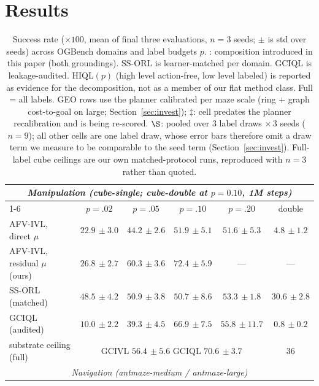 \documentclass{article}
\newcommand{\pmm}[2]{#1{\scriptstyle\,\pm #2}}
\theoremstyle{plain}
\theoremstyle{definition}
\newcommand{\best}[1]{\bm{#1}}
\begin{document}
\section{Results}
\label{sec:results}
\begin{table}[t]
\centering
\caption{Success rate ($\times 100$, mean of final three evaluations, $n{=}3$ seeds; $\pm$ is std over seeds) across OGBench domains and label budgets $p$. \dag: composition introduced in this paper (both groundings). SS-ORL is learner-matched per domain. GCIQL is leakage-audited. HIQL$(p)$ (high level action-free, low level labeled) is reported as evidence for the decomposition, not as a member of our flat method class. Full = all labels. GEO rows use the planner calibrated per maze scale (ring + graph cost-to-goal on large; Section~\ref{sec:invest}); $\ddagger$: cell predates the planner recalibration and is being re-scored. $\S$: pooled over $3$ label draws $\times\,3$ seeds ($n{=}9$); all other cells are one label draw, whose error bars therefore omit a draw term we measure to be comparable to the seed term (Section~\ref{sec:invest}). Full-label cube ceilings are our own matched-protocol runs, reproduced with $n{=}3$ rather than quoted.}
\label{tab:main}
\vspace{2pt}
\small
\setlength{\tabcolsep}{3.2pt}
\begin{tabular}{l cccc c}
\toprule
\multicolumn{6}{c}{\emph{Manipulation (cube-single; cube-double at $p{=}0.10$, 1M steps)}}\\
\cmidrule(lr){1-6}
 & $p{=}.02$ & $p{=}.05$ & $p{=}.10$ & $p{=}.20$ & double \\
\midrule
AFV-IVL, direct $\mu$ & $\pmm{22.9}{3.0}$ & $\pmm{44.2}{2.6}$ & $\pmm{51.9}{5.1}$ & $\pmm{51.6}{5.3}$ & $\pmm{4.8}{1.2}$ \\
AFV-IVL, residual $\mu$ (ours) & $\pmm{26.8}{2.7}$ & $\best{\pmm{60.3}{3.6}}$\rlap{$^{\S}$} & $\best{\pmm{72.4}{5.9}}$\rlap{$^{\S}$} & --- & --- \\
SS-ORL (matched) & $\best{\pmm{48.5}{4.2}}$ & $\pmm{50.9}{3.8}$ & $\pmm{50.7}{8.6}$ & $\pmm{53.3}{1.8}$ & $\best{\pmm{30.6}{2.8}}$ \\
GCIQL (audited) & $\pmm{10.0}{2.2}$ & $\pmm{39.3}{4.5}$ & $\pmm{66.9}{7.5}$ & $\pmm{55.8}{11.7}$ & $\pmm{0.8}{0.2}$ \\
\midrule
substrate ceiling (full) & \multicolumn{4}{c}{GCIVL $\pmm{56.4}{5.6}$ \qquad GCIQL $\pmm{70.6}{3.7}$} & $36$ \\
\midrule
\multicolumn{6}{c}{\emph{Navigation (antmaze-medium / antmaze-large)}}\\

\end{tabular}
\end{table}
\end{document}
